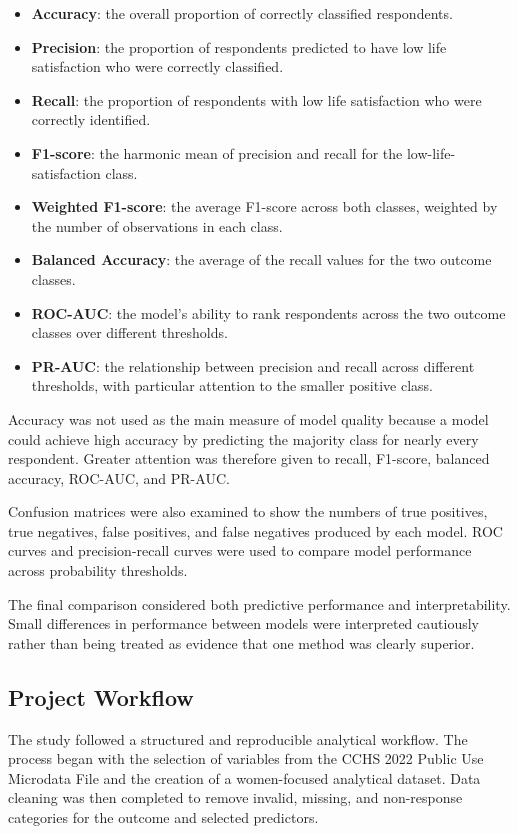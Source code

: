 \documentclass[12pt]{article}
\begin{document}
\begin{itemize}
    \item \textbf{Accuracy}: the overall proportion of correctly classified respondents.
    \item \textbf{Precision}: the proportion of respondents predicted to have low life satisfaction who were correctly classified.
    \item \textbf{Recall}: the proportion of respondents with low life satisfaction who were correctly identified.
    \item \textbf{F1-score}: the harmonic mean of precision and recall for the low-life-satisfaction class.
    \item \textbf{Weighted F1-score}: the average F1-score across both classes, weighted by the number of observations in each class.
    \item \textbf{Balanced Accuracy}: the average of the recall values for the two outcome classes.
    \item \textbf{ROC-AUC}: the model's ability to rank respondents across the two outcome classes over different thresholds.
    \item \textbf{PR-AUC}: the relationship between precision and recall across different thresholds, with particular attention to the smaller positive class.
\end{itemize}

Accuracy was not used as the main measure of model quality because a model could achieve high accuracy by predicting the majority class for nearly every respondent. Greater attention was therefore given to recall, F1-score, balanced accuracy, ROC-AUC, and PR-AUC.

Confusion matrices were also examined to show the numbers of true positives, true negatives, false positives, and false negatives produced by each model. ROC curves and precision-recall curves were used to compare model performance across probability thresholds.

The final comparison considered both predictive performance and interpretability. Small differences in performance between models were interpreted cautiously rather than being treated as evidence that one method was clearly superior.

\subsection{Project Workflow}

The study followed a structured and reproducible analytical workflow. The process began with the selection of variables from the CCHS 2022 Public Use Microdata File and the creation of a women-focused analytical dataset. Data cleaning was then completed to remove invalid, missing, and non-response categories for the outcome and selected predictors.
\end{document}

